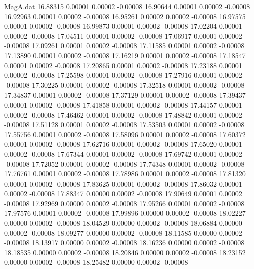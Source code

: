 \begin{filecontents}{MagA.dat}
  16.88315    0.00001    0.00002   -0.00008
  16.90644    0.00001    0.00002   -0.00008
  16.92963    0.00001    0.00002   -0.00008
  16.95261    0.00002    0.00002   -0.00008
  16.97575    0.00001    0.00002   -0.00008
  16.99873    0.00001    0.00002   -0.00008
  17.02204    0.00001    0.00002   -0.00008
  17.04511    0.00001    0.00002   -0.00008
  17.06917    0.00001    0.00002   -0.00008
  17.09261    0.00001    0.00002   -0.00008
  17.11585    0.00001    0.00002   -0.00008
  17.13890    0.00001    0.00002   -0.00008
  17.16219    0.00001    0.00002   -0.00008
  17.18547    0.00001    0.00002   -0.00008
  17.20865    0.00001    0.00002   -0.00008
  17.23188    0.00001    0.00002   -0.00008
  17.25598    0.00001    0.00002   -0.00008
  17.27916    0.00001    0.00002   -0.00008
  17.30225    0.00001    0.00002   -0.00008
  17.32518    0.00001    0.00002   -0.00008
  17.34837    0.00001    0.00002   -0.00008
  17.37129    0.00001    0.00002   -0.00008
  17.39437    0.00001    0.00002   -0.00008
  17.41858    0.00001    0.00002   -0.00008
  17.44157    0.00001    0.00002   -0.00008
  17.46462    0.00001    0.00002   -0.00008
  17.48842    0.00001    0.00002   -0.00008
  17.51128    0.00001    0.00002   -0.00008
  17.53503    0.00001    0.00002   -0.00008
  17.55756    0.00001    0.00002   -0.00008
  17.58096    0.00001    0.00002   -0.00008
  17.60372    0.00001    0.00002   -0.00008
  17.62716    0.00001    0.00002   -0.00008
  17.65020    0.00001    0.00002   -0.00008
  17.67344    0.00001    0.00002   -0.00008
  17.69742    0.00001    0.00002   -0.00008
  17.72052    0.00001    0.00002   -0.00008
  17.74348    0.00001    0.00002   -0.00008
  17.76761    0.00001    0.00002   -0.00008
  17.78986    0.00001    0.00002   -0.00008
  17.81320    0.00001    0.00002   -0.00008
  17.83625    0.00001    0.00002   -0.00008
  17.86032    0.00001    0.00002   -0.00008
  17.88347    0.00000    0.00002   -0.00008
  17.90649    0.00001    0.00002   -0.00008
  17.92969    0.00000    0.00002   -0.00008
  17.95266    0.00001    0.00002   -0.00008
  17.97576    0.00001    0.00002   -0.00008
  17.99896    0.00000    0.00002   -0.00008
  18.02227    0.00000    0.00002   -0.00008
  18.04529    0.00000    0.00002   -0.00008
  18.06884    0.00000    0.00002   -0.00008
  18.09277    0.00000    0.00002   -0.00008
  18.11585    0.00000    0.00002   -0.00008
  18.13917    0.00000    0.00002   -0.00008
  18.16236    0.00000    0.00002   -0.00008
  18.18535    0.00000    0.00002   -0.00008
  18.20846    0.00000    0.00002   -0.00008
  18.23152    0.00000    0.00002   -0.00008
  18.25482    0.00000    0.00002   -0.00008

\end{filecontents}
